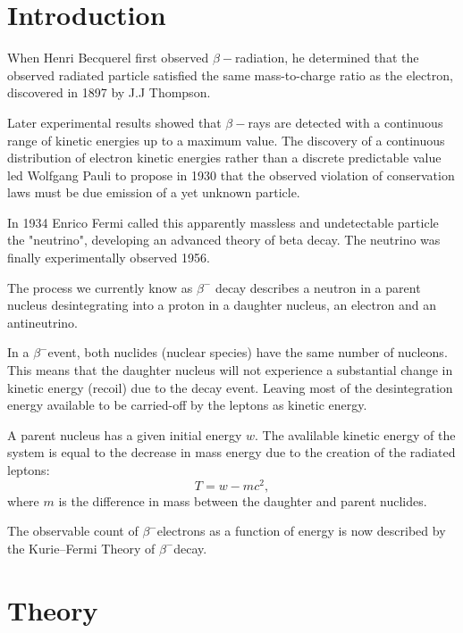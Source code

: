 \documentclass[10pt, a4paper]{article}
\begin{document}
\section{Introduction}
\begin{multicols}{2}
When Henri Becquerel first observed $\beta-$radiation, he determined that the observed radiated particle satisfied the same mass-to-charge ratio as the electron, discovered in 1897 by J.J Thompson\cite{Wikipedia-particle}. 

Later experimental results showed that $\beta-$rays are detected with a continuous range of kinetic energies up to a maximum value\cite{SMM}. 
The discovery of a continuous distribution of electron kinetic energies rather than a discrete predictable value led Wolfgang Pauli to propose in 1930 that the observed violation of conservation laws must be due emission of a yet unknown particle.

In 1934 Enrico Fermi called this apparently massless and undetectable particle the "neutrino", developing an advanced theory of beta decay. The neutrino was finally experimentally observed 1956.\cite{Nave-beta} 


The process we currently know as $\beta^{-}$ decay describes a neutron in a parent nucleus desintegrating into a proton in a daughter nucleus, an electron and an antineutrino.

In a $\beta^{-}$event, both nuclides (nuclear species) have the same number of nucleons. This means that the daughter nucleus will not experience a substantial change in kinetic energy (recoil) due to the decay event. Leaving most of the desintegration energy available to be carried-off by the leptons as kinetic energy. 

A parent nucleus has a given initial energy $w$. 
The avalilable kinetic energy of the system is equal to the decrease in mass energy due to the creation of the radiated leptons:
\begin{equation}T = w - m c^2,
\end{equation} where $m$ is the difference in mass between the daughter and parent nuclides.

The observable count of $\beta^{-}$electrons as a function of energy is now described by the Kurie--Fermi Theory of $\beta^{-}$decay.

\section{Theory}


\end{multicols}
\end{document}

